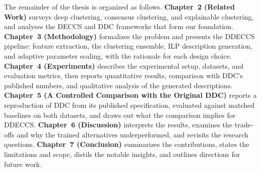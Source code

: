 The remainder of the thesis is organized as follows. \textbf{Chapter~2 (Related Work)} surveys deep clustering, consensus clustering, and explainable clustering, and analyses the DECCS and DDC frameworks that form our foundation. \textbf{Chapter~3 (Methodology)} formalizes the problem and presents the DDECCS pipeline: feature extraction, the clustering ensemble, ILP description generation, and adaptive parameter scaling, with the rationale for each design choice. \textbf{Chapter~4 (Experiments)} describes the experimental setup, datasets, and evaluation metrics, then reports quantitative results, comparison with DDC's published numbers, and qualitative analysis of the generated descriptions. \textbf{Chapter~5 (A Controlled Comparison with the Original DDC)} reports a reproduction of DDC from its published specification, evaluated against matched baselines on both datasets, and draws out what the comparison implies for DDECCS. \textbf{Chapter~6 (Discussion)} interprets the results, examines the trade-offs and why the trained alternatives underperformed, and revisits the research questions. \textbf{Chapter~7 (Conclusion)} summarizes the contributions, states the limitations and scope, distils the notable insights, and outlines directions for future work.